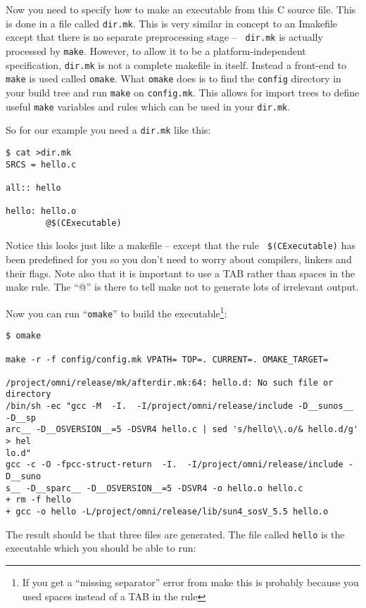 \documentclass[11pt,twoside,onecolumn]{article}
\begin{document}
Now you need to specify how to make an executable from this C source file.
This is done in a file called {\tt dir.mk}.  This is very similar in concept to
an Imakefile except that there is no separate preprocessing stage -- {\tt
dir.mk} is actually processed by {\tt make}.  However, to allow it to be a
platform-independent specification, {\tt dir.mk} is not a complete makefile in
itself.  Instead a front-end to {\tt make} is used called {\tt omake}.  What
{\tt omake} does is to find the {\tt config} directory in your build tree and
run {\tt make} on {\tt config.mk}.  This allows for import trees to define
useful {\tt make} variables and rules which can be used in your {\tt dir.mk}.

So for our example you need a {\tt dir.mk} like this:

{\footnotesize \begin{verbatim}
$ cat >dir.mk
SRCS = hello.c

all:: hello

hello: hello.o
        @$(CExecutable)
\end{verbatim}}

Notice this looks just like a makefile -- except that the rule {\tt
\$(CExecutable)} has been predefined for you so you don't need to worry about
compilers, linkers and their flags.  Note also that it is important to use a
TAB rather than spaces in the make rule.  The ``@'' is there to tell make not
to generate lots of irrelevant output.

Now you can run ``{\tt omake}'' to build the executable\footnote{If you get a
``missing separator'' error from make this is probably because you used spaces
instead of a TAB in the rule}:

{\footnotesize \begin{verbatim}
$ omake

make -r -f config/config.mk VPATH= TOP=. CURRENT=. OMAKE_TARGET=

/project/omni/release/mk/afterdir.mk:64: hello.d: No such file or directory
/bin/sh -ec "gcc -M  -I.  -I/project/omni/release/include -D__sunos__ -D__sp
arc__ -D__OSVERSION__=5 -DSVR4 hello.c | sed 's/hello\\.o/& hello.d/g' > hel
lo.d"
gcc -c -O -fpcc-struct-return  -I.  -I/project/omni/release/include -D__suno
s__ -D__sparc__ -D__OSVERSION__=5 -DSVR4 -o hello.o hello.c
+ rm -f hello 
+ gcc -o hello -L/project/omni/release/lib/sun4_sosV_5.5 hello.o 
\end{verbatim}}

The result should be that three files are generated.  The file called
{\tt hello} is the executable which you should be able to run:
\end{document}
